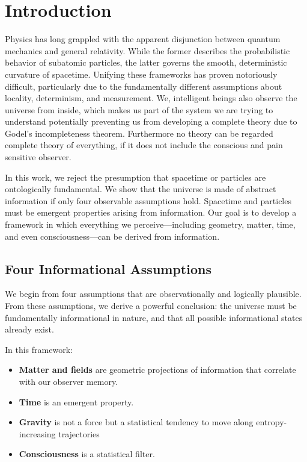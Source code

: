 \chapter{Introduction}

Physics has long grappled with the apparent disjunction between quantum mechanics and general relativity. While the former describes the probabilistic behavior of subatomic particles, the latter governs the smooth, deterministic curvature of spacetime. Unifying these frameworks has proven notoriously difficult, particularly due to the fundamentally different assumptions about locality, determinism, and measurement. We, intelligent beings also observe the universe from inside, which makes us part of the system we are trying to understand potentially preventing us from developing a complete theory due to Godel's incompleteness theorem. Furthermore no theory can be regarded complete theory of everything, if it does not include the conscious and pain sensitive observer.

In this work, we reject the presumption that spacetime or particles are ontologically fundamental. We show that the universe
is made of abstract information if only four observable assumptions hold. Spacetime and particles must be emergent properties arising from information. Our goal is to develop a framework in which everything we perceive—including geometry, matter, time, and even consciousness—can be derived from information.

\section{Four Informational Assumptions}

We begin from four assumptions that are observationally and logically plausible.  From these assumptions, we derive a powerful conclusion: the universe must be fundamentally informational in nature, and that all possible informational states already exist.

In this framework:

\begin{itemize}
      \item \textbf{Matter and fields} are geometric projections of information that correlate with our observer memory.
      \item \textbf{Time} is an emergent property.
      \item \textbf{Gravity} is not a force but a statistical tendency to move along entropy-increasing trajectories
      \item \textbf{Consciousness} is a statistical filter.
\end{itemize}

